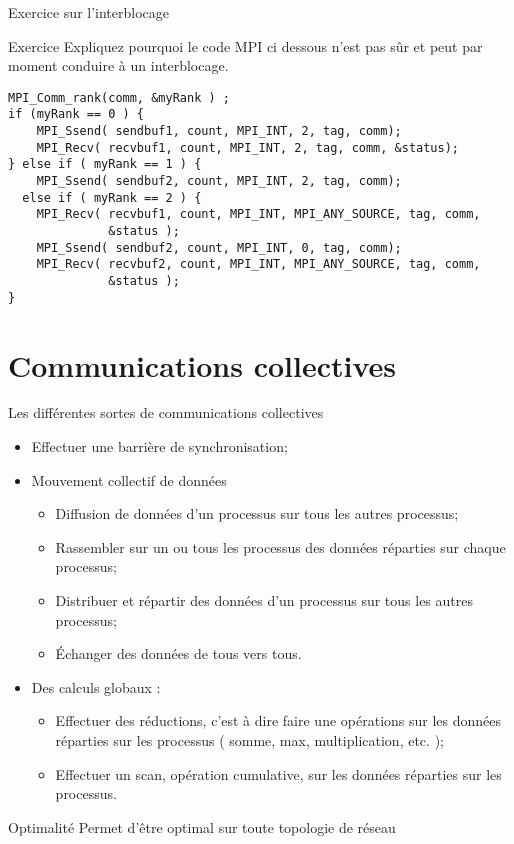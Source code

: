 \documentclass[handout]{beamer}
\begin{document}
\begin{frame}[fragile]{Exercice sur l'interblocage}

\begin{block}{Exercice}
Expliquez pourquoi le code MPI ci dessous n'est pas sûr et peut par moment
conduire à un interblocage.

\begin{lstlisting}
MPI_Comm_rank(comm, &myRank ) ;
if (myRank == 0 ) {
    MPI_Ssend( sendbuf1, count, MPI_INT, 2, tag, comm);
    MPI_Recv( recvbuf1, count, MPI_INT, 2, tag, comm, &status);
} else if ( myRank == 1 ) {
    MPI_Ssend( sendbuf2, count, MPI_INT, 2, tag, comm);
  else if ( myRank == 2 ) {
    MPI_Recv( recvbuf1, count, MPI_INT, MPI_ANY_SOURCE, tag, comm, 
              &status );
    MPI_Ssend( sendbuf2, count, MPI_INT, 0, tag, comm);
    MPI_Recv( recvbuf2, count, MPI_INT, MPI_ANY_SOURCE, tag, comm, 
              &status );
}
\end{lstlisting}
\end{block}

\end{frame}

\section{Communications collectives}

\begin{frame}[fragile]{Les différentes sortes de communications collectives}

{\scriptsize
\begin{itemize}
\item Effectuer une barrière de synchronisation;
\item Mouvement collectif de données
  \begin{itemize}
  \item Diffusion de données d'un processus sur tous les autres processus;
  \item Rassembler sur un ou tous les processus des données réparties sur
  chaque processus;
  \item Distribuer et répartir des données d'un processus sur tous les autres 
  processus;
  \item \'Echanger des données de tous vers tous.
  \end{itemize}
\item Des calculs globaux :
  \begin{itemize}
  \item Effectuer des réductions, c'est à dire faire une opérations sur les données réparties
  sur les processus ( somme, max, multiplication, etc. );
  \item Effectuer un scan, opération cumulative, sur les données réparties
  sur les processus.
  \end{itemize}
\end{itemize}
}

\begin{alertblock}{Optimalité}
Permet d'être optimal sur toute topologie de réseau
\end{alertblock}
\end{frame}
\end{document}
